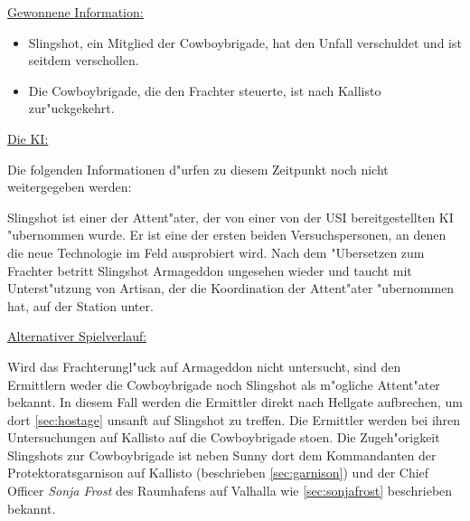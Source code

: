 \begin{remarks}
	\underline{Gewonnene Information:}

	\begin{itemize}
		\item Slingshot, ein Mitglied der Cowboybrigade, hat den Unfall verschuldet und ist seitdem verschollen.
		\item Die Cowboybrigade, die den Frachter steuerte, ist nach Kallisto zur"uckgekehrt.		
	\end{itemize}

	\underline{Die KI:}

	Die folgenden Informationen d"urfen zu diesem Zeitpunkt noch nicht weitergegeben werden:

	Slingshot ist einer der Attent"ater, der von einer von der USI bereitgestellten KI "ubernommen wurde. Er ist eine der ersten beiden Versuchspersonen, an denen die neue Technologie im Feld ausprobiert wird. Nach dem "Ubersetzen zum Frachter betritt Slingshot Armageddon ungesehen wieder und taucht mit Unterst"utzung von Artisan, der die Koordination der Attent"ater "ubernommen hat, auf der Station unter.

	\underline{Alternativer Spielverlauf:}

	Wird das Frachterungl"uck auf Armageddon nicht untersucht, sind den Ermittlern weder die Cowboybrigade noch Slingshot als m"ogliche Attent"ater bekannt. In diesem Fall werden die Ermittler direkt nach Hellgate aufbrechen, um dort \cref{sec:hostage} unsanft auf Slingshot zu treffen. Die Ermittler werden bei ihren Untersuchungen auf Kallisto auf die Cowboybrigade sto\3en. Die Zugeh"origkeit Slingshots zur Cowboybrigade ist neben Sunny dort dem Kommandanten der Protektoratsgarnison auf Kallisto (beschrieben \cref{sec:garnison}) und der Chief Officer \emph{Sonja Frost} des Raumhafens auf Valhalla wie \cref{sec:sonjafrost} beschrieben bekannt.
\end{remarks}

